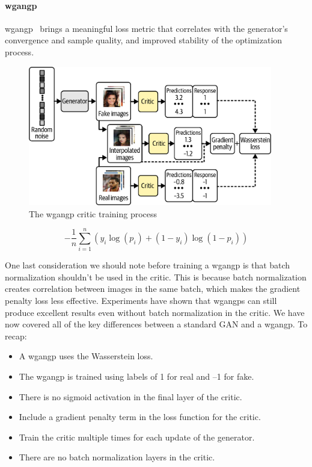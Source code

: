 \paragraph{\gls{wgangp}}

\gls{wgangp}~ brings a meaningful loss metric that correlates with the generator’s convergence and sample quality, and improved stability of the optimization process.

\begin{figure}
	\begin{center}
		\includegraphics[width=0.95\textwidth]{figures/wgangp_train}
	\end{center}
	\caption{The \gls{wgangp}  critic training process}\label{fig:wgangp_training}
\end{figure}

\begin{equation}
	-\frac{1}{n} \sum_{i=1}^{n} \left(y_i \log\left(p_i\right) + \left(1 - y_i\right)\log \left(1-p_i\right)\right)
	\label{eq:binary_cross_entropy_loss}
\end{equation}

One last consideration we should note before training a \gls{wgangp} is that batch normalization shouldn’t be used in the critic.
This is because batch normalization creates correlation between images in the same batch, which makes the gradient penalty loss less effective.
Experiments have shown that \glspl{wgangp}  can still produce excellent results even without batch normalization in the critic.
We have now covered all of the key differences between a standard GAN and a \gls{wgangp}. To recap:

\begin{itemize}
	\item A \gls{wgangp} uses the Wasserstein loss.
	\item The \gls{wgangp}  is trained using labels of 1 for real and –1 for fake.
	\item There is no sigmoid activation in the final layer of the critic.
	\item Include a gradient penalty term in the loss function for the critic.
	\item Train the critic multiple times for each update of the generator.
	\item There are no batch normalization layers in the critic.
\end{itemize}

